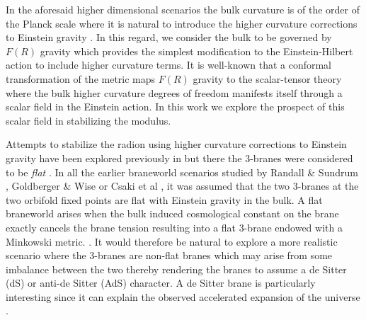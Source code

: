 \documentclass{article}
\begin{document}
In the aforesaid higher dimensional scenarios the bulk curvature is of the order of the Planck scale where it is natural 
to introduce the higher curvature corrections to Einstein gravity \cite{Nojiri:2010wj,Nojiri:2017ncd}. In this regard, we consider the bulk to be governed 
by $F(R)$ gravity which provides the simplest modification to the Einstein-Hilbert action to include higher curvature terms. 
It is well-known that a conformal transformation of the metric maps $F(R)$ gravity to the scalar-tensor theory where the bulk 
higher curvature degrees of freedom manifests itself through a scalar field in the Einstein action. In this work we explore the 
prospect of this scalar field in stabilizing the modulus. 


Attempts to stabilize the radion using higher curvature corrections to Einstein gravity have been explored 
previously in \cite{Chakraborty:2016gpg,Das:2017htt,Elizalde:2018rmz,Chakraborty:2014zya,Anand:2014vqa} but there the 3-branes were considered to be \emph{flat} . In all the earlier braneworld scenarios  studied by Randall \& Sundrum \cite{Randall:1999ee}, Goldberger \& Wise \cite{Goldberger:1999uk,GOLDBERGER2000275} or Csaki et al \cite{Csaki:2000zn} , it was assumed that the two 3-branes at the two orbifold fixed points  are flat with  Einstein gravity in the bulk. A flat braneworld arises when the bulk induced cosmological constant on the brane exactly cancels the brane tension resulting into a flat 3-brane endowed with a Minkowski metric. \cite{Sasaki:1999mi}. It would therefore be natural to explore a more realistic scenario  where the 3-branes are  non-flat branes which may arise from some imbalance between the two thereby rendering the branes to assume a de Sitter (dS) or anti-de Sitter (AdS) character. A de Sitter brane is particularly interesting since it can explain the observed accelerated expansion of the universe \cite{SupernovaCosmologyProject:1998vns,1538-3881-116-3-1009}.
\end{document}
